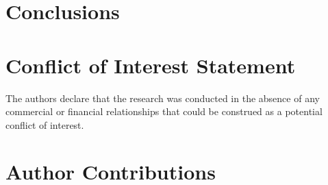 \documentclass[utf8]{frontiersFPHY} %
\begin{document}
\newline
\section{Conclusions}
%



\section*{Conflict of Interest Statement}

The authors declare that the research was conducted in the absence of any commercial or financial relationships that could be construed as a potential conflict of interest.

\section*{Author Contributions}



%


\end{document}
